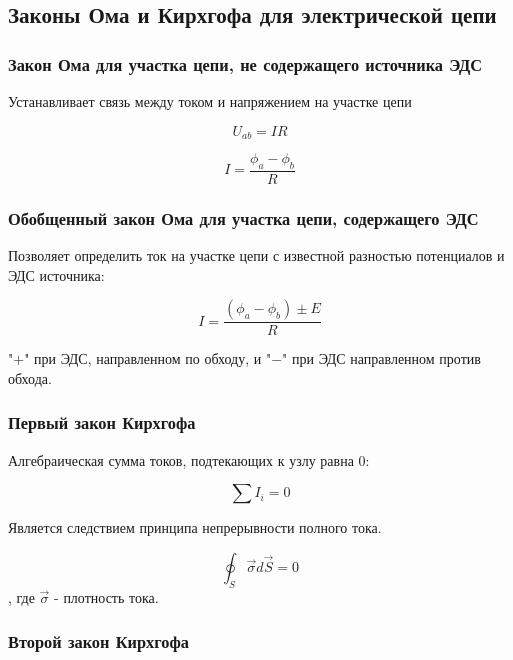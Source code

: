 \subsection{Законы Ома и Кирхгофа для электрической цепи}

\subsubsection{Закон Ома для участка цепи, не содержащего источника ЭДС}

Устанавливает связь между током и напряжением на участке цепи

\begin{equation}
U_{ab} = I R
\end{equation}

\begin{equation}
I = \frac{\phi_a - \phi_b}{R}
\end{equation}

\subsubsection{Обобщенный закон Ома для участка цепи, содержащего ЭДС}

Позволяет определить ток на участке цепи с известной разностью потенциалов и ЭДС источника:

\begin{equation}
 I = \frac{(\phi_a - \phi_b) \pm E}{R}
\end{equation}

"$+$" при ЭДС, направленном по обходу, и "$-$" при ЭДС направленном против обхода.

\subsubsection{Первый закон Кирхгофа}

Алгебраическая сумма токов, подтекающих к узлу равна 0:

\begin{equation}
\sum I_i = 0
\end{equation}

Является следствием принципа непрерывности полного тока.

\begin{equation}
\oint_S \overrightarrow{\sigma} d \overrightarrow{S} = 0
\end{equation}
, где $ \overrightarrow{\sigma}$ - плотность тока. 

\subsubsection{Второй закон Кирхгофа}

